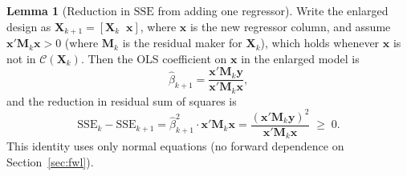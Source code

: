 \documentclass[12pt,a4paper]{article}
\theoremstyle{definition}
\newtheorem{lemma}[theorem]{Lemma}
\newcommand{\SSE}{\mathrm{SSE}}
\newcommand{\bX}{\mathbf{X}}
\newcommand{\by}{\mathbf{y}}
\newcommand{\bx}{\mathbf{x}}
\newcommand{\bM}{\mathbf{M}}
\newcommand{\calC}{\mathcal{C}}
\begin{document}
\begin{lemma}[Reduction in $\SSE$ from adding one regressor]\label{lem:sse-reduction}
Write the enlarged design as $\bX_{k+1} = [\bX_k \;\; \bx]$, where $\bx$ is the new regressor column, and assume $\bx'\bM_k\bx > 0$ (where $\bM_k$ is the residual maker for $\bX_k$), which holds whenever $\bx$ is not in $\calC(\bX_k)$. Then the OLS coefficient on $\bx$ in the enlarged model is
\begin{equation}\label{eq:beta-new}
\hat{\beta}_{k+1} = \frac{\bx'\bM_k\by}{\bx'\bM_k\bx},
\end{equation}
and the reduction in residual sum of squares is
\begin{equation}\label{eq:sse-reduction}
\SSE_k - \SSE_{k+1} = \hat{\beta}_{k+1}^2 \cdot \bx'\bM_k\bx = \frac{(\bx'\bM_k\by)^2}{\bx'\bM_k\bx} \;\geqslant\; 0.
\end{equation}
This identity uses only normal equations (no forward dependence on Section~\ref{sec:fwl}).
\end{lemma}
\end{document}
